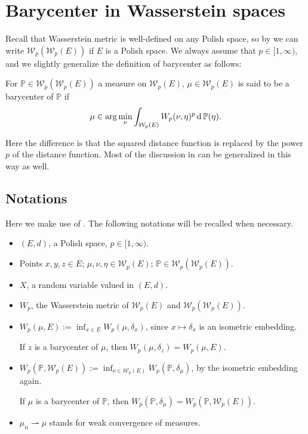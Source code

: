 \section{Barycenter in Wasserstein spaces}

Recall that Wasserstein metric is well-defined on any Polish space,
so by 
we can write $\mathcal{W}_p(\mathcal{W}_p(E))$ if $E$ is a Polish space.
We always assume that $p \in [1, \infty)$,
and we slightly generalize the definition of barycenter as follows:

\begin{defn}
	For $\mathbb{P} \in \mathcal{W}_p(\mathcal{W}_p(E))$ a measure on $\mathcal{W}_p(E)$,
	$\mu \in \mathcal{W}_p(E)$ is said to be a barycenter of $\mathbb{P}$ if
	\[
		\mu \in \arg \min_{\nu} \int_{\mathcal{W}_p(E)} W_p(\nu, \eta)^p \operatorname{d} \mathbb{P} (\eta).
	\]
\end{defn}

Here the difference is that
the squared distance function is replaced by the power $p$ of the distance function.
Most of the discussion in  can be generalized in this way as well.

\subsection{Notations}

\label{subsection:convention}
Here we make use of .
The following notations will be recalled when necessary.

\begin{itemize}
	\item $(E,d)$, a Polish space, $p \in [1, \infty)$.
	\item Points $x,y,z \in E$; $\mu, \nu, \eta \in \mathcal{W}_p(E)$; $\mathbb{P} \in \mathcal{W}_p(\mathcal{W}_p(E))$.
	\item $X$, a random variable valued in $(E, d)$.
	\item $W_p$, the Wasserstein metric of $\mathcal{W}_p(E)$ and $\mathcal{W}_p(\mathcal{W}_p(E))$.
	\item $W_p(\mu, E):= \inf_{x \in E}W_p(\mu, \delta_x)$,
	      since $x \mapsto \delta_x$ is an isometric embedding.

	      If $z$ is a barycenter of $\mu$, then $W_p(\mu, \delta_z)=W_p(\mu, E)$.
	\item $W_p(\mathbb{P}, \mathcal{W}_p(E)) := \inf_{\nu \in \mathcal{W}_p(E)} W_p(\mathbb{P}, \delta_\mu)$,
	      by the isometric embedding again.

	      If $\mu$ is a barycenter of $\mathbb{P}$, then $W_p(\mathbb{P}, \delta_\mu)=W_p(\mathbb{P}, \mathcal{W}_p(E))$.
	\item $\mu_n \rightharpoonup \mu$ stands for weak convergence of measures.

\end{itemize}

